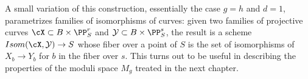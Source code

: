 A small variation of this construction, essentially the case $g=h$ and $d=1$, parametrizes families of
isomorphisms of curves: given two families of projective curves $\cX \subset B \times \PP^r_{S}$ and $\mathcal{Y} \subset B\times \PP^s_{S}$, the result is a scheme $Isom(\cX, \mathcal{Y}) \to S$ whose
fiber over a point of $S$ is the set of isomorphisms of $X_{b}\to Y_{b}$ for $b$ in the fiber over $s$.
This turns out to be useful in describing the properties of the moduli space $M_{g}$ treated in the
next chapter.


%
%
%
%
%
